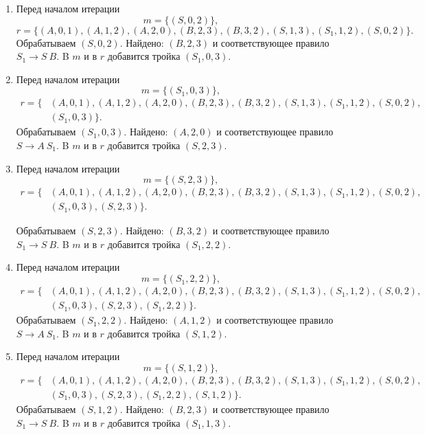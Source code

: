 \begin{example}
\begin{enumerate}
   \item
   Перед началом итерации
     $$
     m = \{(S, 0, 2)\},
     $$
     $$
     r= \{(A,0,1),(A,1,2),(A,2,0),(B,2,3),(B,3,2),(S,1,3),(S_1, 1, 2),(S, 0, 2)\}.
     $$
     Обрабатываем $(S, 0, 2)$.
     Найдено: $(B,2,3)$ и соответствующее правило $S_1 \to S \ B$.
     B $m$ и в $r$ добавится тройка $(S_1, 0, 3)$.

   \item
   Перед началом итерации
     $$
     m = \{(S_1, 0, 3)\},
     $$
     \begin{align*}
     r= \{&(A,0,1),(A,1,2),(A,2,0),(B,2,3),(B,3,2),(S,1,3),(S_1, 1, 2),(S, 0, 2),\\
          &(S_1, 0, 3)\}.
     \end{align*}
     Обрабатываем $(S_1, 0, 3)$.
     Найдено: $(A,2,0)$ и соответствующее правило $S \to A \ S_1$.
     B $m$ и в $r$ добавится тройка $(S, 2, 3)$.

   \item
   Перед началом итерации
     $$
     m = \{(S, 2, 3)\},
     $$
     \begin{align*}
     r= \{&(A,0,1),(A,1,2),(A,2,0),(B,2,3),(B,3,2),(S,1,3),(S_1, 1, 2),(S, 0, 2),\\
          &(S_1, 0, 3),(S, 2, 3)\}.
     \end{align*}

     Обрабатываем $(S, 2, 3)$.
     Найдено: $(B,3,2)$ и соответствующее правило $S_1 \to S \ B$.
     B $m$ и в $r$ добавится тройка $(S_1, 2, 2)$.

   \item
   Перед началом итерации
     $$
     m = \{(S_1, 2, 2)\},
     $$
     \begin{align*}
     r= \{&(A,0,1),(A,1,2),(A,2,0),(B,2,3),(B,3,2),(S,1,3),(S_1, 1, 2),(S, 0, 2),\\
          &(S_1, 0, 3),(S, 2, 3),(S_1, 2, 2)\}.
     \end{align*}
     Обрабатываем $(S_1, 2, 2)$.
     Найдено: $(A,1,2)$ и соответствующее правило $S \to A \ S_1$.
     B $m$ и в $r$ добавится тройка $(S, 1, 2)$.

   \item
   Перед началом итерации
     $$
     m = \{(S, 1, 2)\},
     $$
     \begin{align*}
     r= \{&(A,0,1),(A,1,2),(A,2,0),(B,2,3),(B,3,2),(S,1,3),(S_1, 1, 2),(S, 0, 2),\\
          &(S_1, 0, 3),(S, 2, 3),(S_1, 2, 2),(S, 1, 2)\}.
     \end{align*}
     Обрабатываем $(S, 1, 2)$.
     Найдено: $(B,2,3)$ и соответствующее правило $S_1 \to S \ B$.
     B $m$ и в $r$ добавится тройка $(S_1, 1, 3)$.


\end{enumerate}
\end{example}
